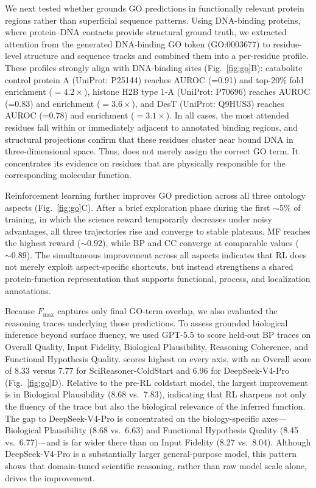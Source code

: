 We next tested whether \projName{} grounds GO predictions in functionally relevant protein regions rather than superficial sequence patterns. Using DNA-binding proteins, where protein--DNA contacts provide structural ground truth, we extracted attention from the generated DNA-binding GO token (GO:0003677) to residue-level structure and sequence tracks and combined them into a per-residue profile. These profiles strongly align with DNA-binding sites (Fig.~\ref{fig:go}B): catabolite control protein A (UniProt: P25144) reaches AUROC (=0.91) and top-20\% fold enrichment ($=4.2\times$), histone H2B type 1-A (UniProt: P70696) reaches AUROC (=0.83) and enrichment ($=3.6\times$), and DesT (UniProt: Q9HUS3) reaches AUROC (=0.78) and enrichment ($=3.1\times$).
In all cases, the most attended residues fall within or immediately adjacent to annotated binding regions, and structural projections confirm that these residues cluster near bound DNA in three-dimensional space. Thus, \projName{} does not merely assign the correct GO term. It concentrates its evidence on residues that are physically responsible for the corresponding molecular function.

Reinforcement learning further improves GO prediction across all three ontology aspects (Fig.~\ref{fig:go}C). After a brief exploration phase during the first \(\sim\!5\%\) of training, in which the science reward temporarily decreases under noisy advantages, all three trajectories rise and converge to stable plateaus. MF reaches the highest reward (\(\sim\!0.92\)), while BP and CC converge at comparable values (\(\sim\!0.89\)).
The simultaneous improvement across all aspects indicates that RL does not merely exploit aspect-specific shortcuts, but instead strengthens a shared protein-function representation that supports functional, process, and localization annotations.

Because $F_{\max}$ captures only final GO-term overlap, we also evaluated the reasoning traces underlying those predictions. To assess grounded biological inference beyond surface fluency, we used GPT-5.5 to score held-out BP traces on Overall Quality, Input Fidelity, Biological Plausibility, Reasoning Coherence, and Functional Hypothesis Quality. \projName{} scores highest on every axis, with an Overall score of 8.33 versus 7.77 for SciReasoner-ColdStart and 6.96 for DeepSeek-V4-Pro \citep{deepseekai2026deepseekv4} (Fig.~\ref{fig:go}D). 
Relative to the pre-RL coldstart model, the largest improvement is in Biological Plausibility (8.68 vs.\ 7.83), indicating that RL sharpens not only the fluency of the trace but also the biological relevance of the inferred function. 
The gap to DeepSeek-V4-Pro is concentrated on the biology-specific axes---Biological Plausibility (8.68 vs.\ 6.63) and Functional Hypothesis Quality (8.45 vs.\ 6.77)---and is far wider there than on Input Fidelity (8.27 vs.\ 8.04). Although DeepSeek-V4-Pro is a substantially larger general-purpose model, this pattern shows that domain-tuned scientific reasoning, rather than raw model scale alone, drives the improvement.


